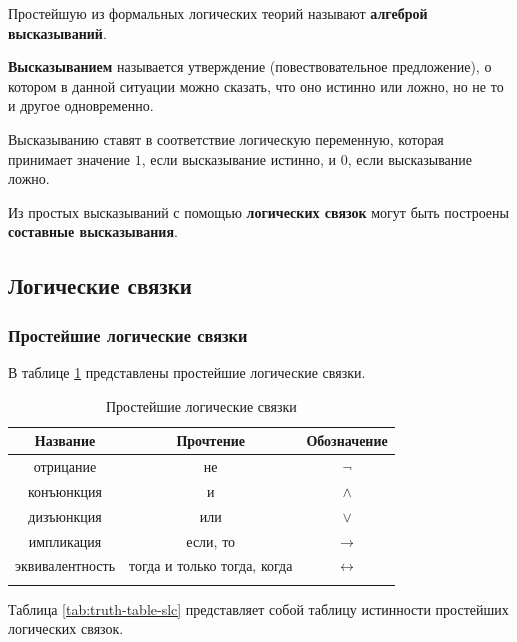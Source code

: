 \documentclass[a5paper, 11pt]{extarticle}
\theoremstyle{definition}
\theoremstyle{definition}
\theoremstyle{definition}
\numberwithin{figure}{section}
\numberwithin{table}{section}
\begin{document}
Простейшую из формальных логических теорий называют \textbf{алгеброй высказываний}.

\textbf{Высказыванием} называется утверждение (повествовательное предложение), о котором в данной ситуации можно сказать, что оно истинно или ложно, но не то и другое одновременно.

Высказыванию ставят в соответствие логическую переменную, которая принимает значение \(1\), если высказывание истинно, и \(0\), если высказывание ложно.

Из простых высказываний с помощью \textbf{логических связок} могут быть построены \textbf{составные высказывания}.

\subsection{Логические связки}

\subsubsection{Простейшие логические связки}

В таблице \ref{tab:simplest-logical-connectives} представлены простейшие логические связки.

{
\renewcommand*{\arraystretch}{1.5}
\begin{longtable}{|c|c|c|}
    \hline
    \textbf{Название} & \textbf{Прочтение}          & \textbf{Обозначение} \\
    \hline
    отрицание         & не                          & \(\lnot\)            \\
    \hline
    конъюнкция        & и                           & \(\land\)            \\
    \hline
    дизъюнкция        & или                         & \(\lor\)             \\
    \hline
    импликация        & если, то                    & \(\to\)              \\
    \hline
    эквивалентность   & тогда и только тогда, когда & \(\leftrightarrow\)  \\
    \hline
    \caption{Простейшие логические связки}
    \label{tab:simplest-logical-connectives}
\end{longtable}
}

Таблица \ref{tab:truth-table-slc} представляет собой таблицу истинности простейших логических связок.
\end{document}
